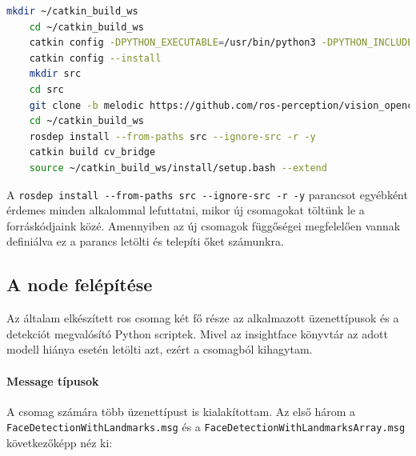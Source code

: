 \begin{lstlisting}[language=bash]
    mkdir ~/catkin_build_ws
    cd ~/catkin_build_ws
    catkin config -DPYTHON_EXECUTABLE=/usr/bin/python3 -DPYTHON_INCLUDE_DIR=/usr/include/python3.6m -DPYTHON_LIBRARY=/usr/lib/x86_64-linux-gnu/libpython3.6m.so
    catkin config --install
    mkdir src
    cd src
    git clone -b melodic https://github.com/ros-perception/vision_opencv.git
    cd ~/catkin_build_ws
    rosdep install --from-paths src --ignore-src -r -y
    catkin build cv_bridge
    source ~/catkin_build_ws/install/setup.bash --extend
\end{lstlisting}
A \lstinline{rosdep install --from-paths src --ignore-src -r -y} parancsot egyébként érdemes minden alkalommal lefuttatni, mikor új csomagokat töltünk le a forráskódjaink közé. Amennyiben az új csomagok függőségei megfelelően vannak definiálva ez a parancs letölti és telepíti őket számunkra.

\subsection{A node felépítése}
Az általam elkészített ros csomag két fő része az alkalmazott üzenettípusok és a detekciót megvalósító Python scriptek. Mivel az insightface könyvtár az adott modell hiánya esetén letölti azt, ezért a csomagból kihagytam. 
\paragraph{Message típusok}\hfill

A csomag számára több üzenettípust is kialakítottam. Az első három a \lstinline{FaceDetectionWithLandmarks.msg} és a \lstinline{FaceDetectionWithLandmarksArray.msg} következőképp néz ki:

